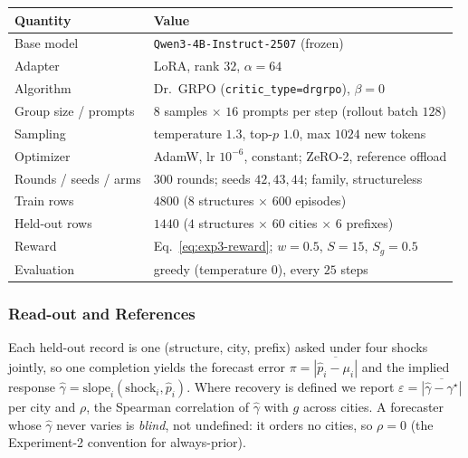 \begin{center}
\begin{minipage}{\linewidth}
\centering
{}
\label{tab:exp3-hparams}
\small
\begin{tabular}{ll}
\toprule
\textbf{Quantity} & \textbf{Value} \\
\midrule
Base model              & \texttt{Qwen3-4B-Instruct-2507} (frozen) \\
Adapter                 & LoRA, rank $32$, $\alpha{=}64$ \\
Algorithm               & Dr.\ GRPO (\texttt{critic\_type=drgrpo}), $\beta{=}0$ \\
Group size / prompts    & $8$ samples $\times$ $16$ prompts per step (rollout batch $128$) \\
Sampling                & temperature $1.3$, top-$p$ $1.0$, max $1024$ new tokens \\
Optimizer               & AdamW, lr $10^{-6}$, constant; ZeRO-2, reference offload \\
Rounds / seeds / arms    & $300$ rounds; seeds $42,43,44$; family, structureless \\
Train rows              & $4800$ ($8$ structures $\times$ $600$ episodes) \\
Held-out rows           & $1440$ ($4$ structures $\times$ $60$ cities $\times$ $6$ prefixes) \\
Reward                  & Eq.~\eqref{eq:exp3-reward}; $w{=}0.5$, $S{=}15$, $S_g{=}0.5$ \\
Evaluation              & greedy (temperature $0$), every $25$ steps \\
\bottomrule
\end{tabular}
\end{minipage}
\end{center}

\subsubsection{Read-out and References}
\label{app:exp3-readout}

Each held-out record is one (structure, city, prefix) asked under four shocks jointly, so one completion
yields the forecast error $\pi=\overline{|\hat p_i-\mu_i|}$ and the implied response
$\hat\gamma=\mathrm{slope}_i(\text{shock}_i,\hat p_i)$. Where recovery is defined we report
$\varepsilon=\overline{|\hat\gamma-\gamma^\star|}$ per city and $\rho$, the Spearman correlation of
$\hat\gamma$ with $g$ across cities. A forecaster whose $\hat\gamma$ never varies is \emph{blind}, not
undefined: it orders no cities, so $\rho=0$ (the Experiment-2 convention for always-prior).

